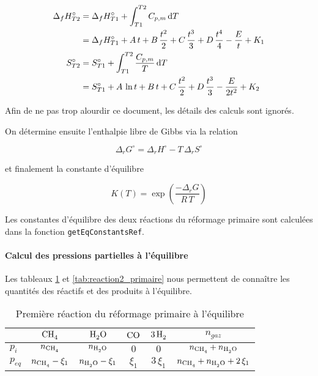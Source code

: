 \begin{align*}
	\Delta_f H_{T2}^{\circ} &= \Delta_f H_{T1}^{\circ} 
	+ \int_{T1}^{T2} C_{p,m} \, \mathrm{d}T \\ 
				 &= \Delta_f H_{T1}^{\circ} 
	+ A \, t + B \, \frac{t^2}{2}  + C \,  \frac{t^3}{3} 
	+ D \, \frac{t^4}{4} - \frac{E}{t} + K_{1} \\		 
	S_{T2}^{\circ}  &= S_{T1}^{\circ} + \int_{T1}^{T2} 
	\frac{C_{p,m}}{T} \, \mathrm{d}T \\
			&= S_{T1}^{\circ} + A \, \ln{t} 
	+ B \, t + C \, \frac{t^2}{2} 
	+ D \, \frac{t^3}{3} - \frac{E}{2 t^{2}} + K_{2} 
\end{align*}

Afin de ne pas trop alourdir ce document, les détails des calculs sont ignorés. 

On détermine ensuite l'enthalpie libre de Gibbs via la relation 

\begin{equation*}
	\Delta_r G^{\circ} = \Delta_r H^{\circ} 
	- T \, \Delta_r S^{\circ}
\end{equation*}

et finalement la constante d'équilibre 

\[ 
K(T) = \exp{\left(\frac{- \Delta_r G}{R \, T}\right)} 
\]

Les constantes d'équilibre des deux réactions du réformage primaire 
sont calculées dans la fonction \texttt{getEqConstantsRef}.

\paragraph{Calcul des pressions partielles à l'équilibre}

Les tableaux \ref{tab:reaction1_primaire} et \ref{tab:reaction2_primaire} nous 
permettent de conna\^itre les quantités des réactifs et des produits à l'équilibre. 

\begin{table}
	\centering
	\begin{tabular}{l|c|c|c|c|c}
		 & $\ce{CH4}$ & $\ce{H2O}$ & $\ce{CO}$ & $\ce{3H2}$ & $n_{gaz}$ \\
		\hline
		$p_{i}$ & $n_{\ce{CH4}}$ & $n_{\ce{H2O}}$ & $0$ & $0$ &
		$n_{\ce{CH4}} + n_{\ce{H2O}}$ \\
		$p_{eq}$ & $n_{\ce{CH4}} - \xi_1$ & $n_{\ce{H2O}} - \xi_1$ & 
		$\xi_1$ & $3 \, \xi_1$ & $n_{\ce{CH4}} + n_{\ce{H2O}} + 2 \, \xi_1 $\\
	\end{tabular}
	\caption{Première réaction du réformage primaire à l'équilibre}
	\label{tab:reaction1_primaire}
\end{table}

